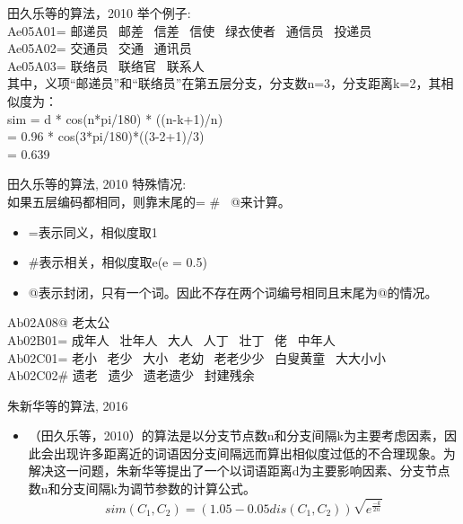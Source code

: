 \documentclass[aspectratio=169]{beamer} %
\begin{document}
    \begin{frame}{田久乐等的算法，2010}
    举个例子: \\
    Ae05A01= 邮递员 \ 邮差 \ 信差 \ 信使 \ 绿衣使者 \ 通信员 \ 投递员 \\
    Ae05A02= 交通员 \ 交通 \ 通讯员 \\
    Ae05A03= 联络员 \ 联络官 \ 联系人 \\
    其中，义项“邮递员”和“联络员”在第五层分支，分支数n=3，分支距离k=2，其相似度为：\\
    sim = d * cos(n*pi/180) * ((n-k+1)/n) \\
        = 0.96 * cos(3*pi/180)*((3-2+1)/3) \\
        = 0.639 \\

    \end{frame}

    \begin{frame}{田久乐等的算法, 2010}
    特殊情况: \\
    如果五层编码都相同，则靠末尾的= \# \ @来计算。\\
    \begin{itemize}
      \item =表示同义，相似度取1 \\
      \item \#表示相关，相似度取e(e = 0.5) \\
      \item @表示封闭，只有一个词。因此不存在两个词编号相同且末尾为@的情况。\\
    \end{itemize}

    Ab02A08@ 老太公 \\
    Ab02B01= 成年人 \ 壮年人 \ 大人 \ 人丁 \ 壮丁 \ 佬 \ 中年人 \\
    Ab02C01= 老小 \ 老少 \ 大小 \ 老幼 \ 老老少少 \ 白叟黄童 \ 大大小小 \\
    Ab02C02\# 遗老 \ 遗少 \ 遗老遗少 \ 封建残余 \\
    \end{frame}

    \begin{frame}{朱新华等的算法, 2016}
      \begin{itemize}
        \item （田久乐等，2010）的算法是以分支节点数n和分支间隔k为主要考虑因素，因此会出现许多距离近的词语因分支间隔远而算出相似度过低的不合理现象。为解决这一问题，朱新华等提出了一个以词语距离d为主要影响因素、分支节点数n和分支间隔k为调节参数的计算公式。
        $$
          sim(C_1, C_2) = (1.05 - 0.05dis(C_1, C_2)) \sqrt{e^{\frac{-k}{2n}}}
        $$
      \end{itemize}
    \end{frame}
\end{document}
